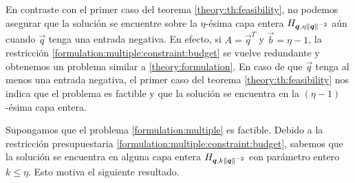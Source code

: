 \begin{observation}
	En contraste con el primer caso del teorema \ref{theory:th:feasibility}, no podemos asegurar que
	la solución se encuentre sobre la $\eta$-ésima capa entera $H_{\boldsymbol{q}, \eta\left\lVert \boldsymbol{q} \right\rVert^{-2}}$ aún cuando
	$\vec{q}$ tenga una entrada negativa. En efecto, si $A = \vec{q}^T$ y $\vec{b} = \eta - 1$, la
	restricción \eqref{formulation:multiple:constraint:budget} se vuelve redundante y obtenemos un
	problema similar a \eqref{theory:formulation}. En caso de que $\vec{q}$ tenga al menos una
	entrada negativa, el primer caso del teorema \ref{theory:th:feasibility} nos indica que el
	problema es factible y que la solución se encuentra en la $(\eta - 1)$-ésima capa entera.
\end{observation}

Supongamos que el problema \eqref{formulation:multiple} es factible. Debido a la restricción
presupuestaria \eqref{formulation:multiple:constraint:budget}, sabemos que la solución se encuentra
en alguna capa entera $H_{\boldsymbol{q}, k\left\lVert \boldsymbol{q} \right\rVert^{-2}}$ con parámetro entero $k \leq \eta$. Esto motiva el siguiente
resultado.

